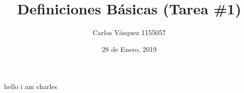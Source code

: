 \documentclass[12pt, letterpaper]{article}
\title{Definiciones Básicas (Tarea \#1)}
\author{Carlos Vásquez 1155057}
\date{28 de Enero, 2019}
\begin{document}
\maketitle

hello i am charles

\end{document}
